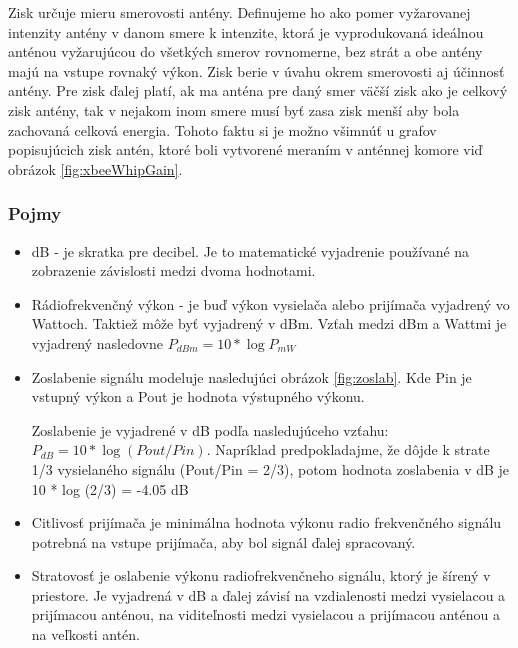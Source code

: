 \documentclass[11pt,twoside,a4paper]{book}
\begin{document}
\noindent Zisk určuje mieru smerovosti antény. Definujeme ho ako pomer vyžarovanej intenzity antény v danom smere k intenzite, ktorá je vyprodukovaná ideálnou anténou vyžarujúcou do všetkých smerov rovnomerne, bez strát a obe antény majú na vstupe rovnaký výkon. Zisk berie v úvahu okrem smerovosti aj účinnosť antény. Pre zisk ďalej platí, ak ma anténa pre daný smer väčší zisk ako je celkový zisk antény, tak v nejakom inom smere musí byť zasa zisk menší aby bola zachovaná celková energia. Tohoto faktu si je možno všimnúť u grafov popisujúcich zisk antén, ktoré boli vytvorené meraním v anténnej komore viď obrázok \ref{fig:xbeeWhipGain}.




\subsubsection{Pojmy}
\begin{itemize}
 \item dB - je skratka pre decibel. Je to matematické vyjadrenie používané na zobrazenie závislosti medzi dvoma hodnotami. 
 \item Rádiofrekvenčný výkon - je buď výkon vysielača alebo prijímača vyjadrený vo Wattoch. Taktiež môže byť vyjadrený v dBm. Vzťah medzi dBm a Wattmi je vyjadrený nasledovne $P_{dBm} = 10 * \log P_{mW}$
 \item Zoslabenie signálu modeluje nasledujúci obrázok \ref{fig:zoslab}. Kde Pin je vstupný výkon a Pout je hodnota výstupného výkonu.

 Zoslabenie je vyjadrené v dB podľa nasledujúceho vzťahu: $P_{dB} = 10 * \log(Pout / Pin)$. Napríklad predpokladajme, že dôjde k strate 1/3 vysielaného signálu (Pout/Pin = 2/3), potom hodnota zoslabenia v dB je 10 * log (2/3) = -4.05 dB
 
\item Citlivosť prijímača je minimálna hodnota výkonu radio frekvenčného signálu potrebná na vstupe prijímača, aby bol signál ďalej spracovaný. 

 \item Stratovosť je oslabenie výkonu radiofrekvenčneho signálu, ktorý je šírený v priestore. Je vyjadrená v dB a ďalej závisí na vzdialenosti medzi vysielacou a prijímacou anténou, na viditeľnosti medzi vysielacou a prijímacou anténou a na veľkosti antén.
\end{itemize}
\end{document}
